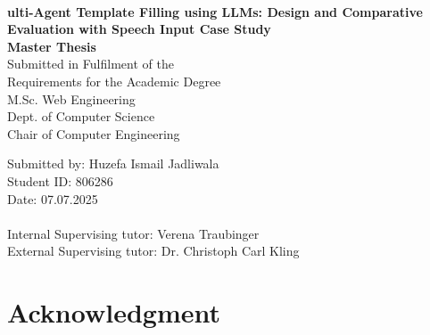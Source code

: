 \documentclass[a4paper, 12pt, oneside, BCOR1cm, toc=chapterentrywithdots]{scrbook}
\begin{document}
\frontmatter

\begin{titlepage}
  {
    \begin{center}
        \\
    \end{center}
    \vspace{0.5cm}
  }
  \begin{center}
    \LARGE{\textbf{ulti-Agent Template Filling using LLMs: Design and Comparative Evaluation with Speech Input Case Study}}\\
    \vspace{1cm}
    \Large{\textbf{Master Thesis}}\\ 
    \vspace{0.5cm}
    Submitted in Fulfilment of the\\
    Requirements for the Academic Degree\\
    M.Sc. Web Engineering\\
    \vspace{0.5cm}
    Dept. of Computer Science\\
    Chair of Computer Engineering
  \end{center}
  \vspace{1cm}
  Submitted by: Huzefa Ismail Jadliwala\\
  Student ID: 806286\\
  Date: 07.07.2025\\
  \vspace{0.3cm}\\
  Internal Supervising tutor: Verena Traubinger \\
  External Supervising tutor: Dr. Christoph Carl Kling \\
\end{titlepage}



\chapter*{Acknowledgment}

\end{document}

